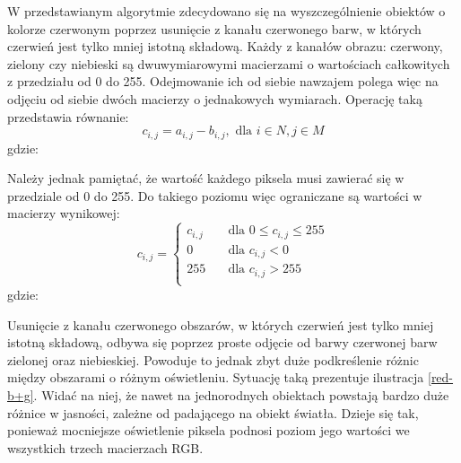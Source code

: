 W przedstawianym algorytmie zdecydowano się na wyszczególnienie obiektów o kolorze czerwonym poprzez usunięcie z kanału czerwonego barw, w których czerwień jest tylko mniej istotną składową. Każdy z kanałów obrazu: czerwony, zielony czy niebieski są dwuwymiarowymi macierzami o wartościach całkowitych z przedziału od 0 do 255. Odejmowanie ich od siebie nawzajem polega więc na odjęciu od siebie dwóch macierzy o jednakowych wymiarach. Operację taką przedstawia równanie:
\begin{equation}
c_{i,j} = a_{i,j} - b_{i,j}, \text{	dla	} i \in N, j \in M
\label{eq:odejmowanie}
\end{equation}
gdzie:
\begin{equationDescriptor}
\end{equationDescriptor}
Należy jednak pamiętać, że wartość każdego piksela musi zawierać się w przedziale od 0 do 255. Do takiego poziomu więc ograniczane są wartości w macierzy wynikowej:
\begin{equation}
c_{i,j} =
  \begin{cases}
    c_{i,j}	& \quad \text{dla } 0 \leq c_{i,j} \leq 255\\
    0	& \quad \text{dla } c_{i,j} < 0\\
    255	& \quad \text{dla } c_{i,j} > 255\\
  \end{cases}
\label{eq:progowanie}
\end{equation}
gdzie:
\begin{equationDescriptor}
\end{equationDescriptor}
Usunięcie z kanału czerwonego obszarów, w których czerwień jest tylko mniej istotną składową, odbywa się poprzez proste odjęcie od barwy czerwonej barw zielonej oraz niebieskiej. Powoduje to jednak zbyt duże podkreślenie różnic między obszarami o różnym oświetleniu. Sytuację taką prezentuje ilustracja \ref{red-b+g}. Widać na niej, że nawet na jednorodnych obiektach powstają bardzo duże różnice w jasności, zależne od padającego na obiekt światła. Dzieje się tak, ponieważ mocniejsze oświetlenie piksela podnosi poziom jego wartości we wszystkich trzech macierzach RGB.\newpage
